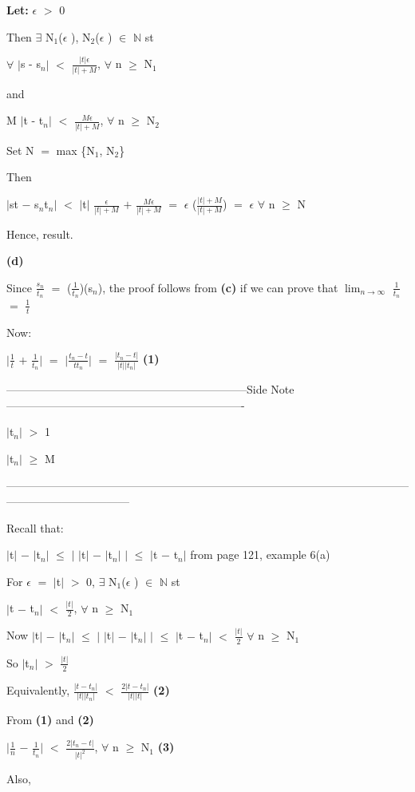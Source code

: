 \documentclass{article}
\newcommand{\mt}[1]{\ensuremath{#1}}
\newcommand{\lt}[1]{\textbf{Let: } #1}
\newcommand{\bpth}[1]{\textbf{(#1)}}
\newcommand{\sidenote}[1]{-----------------------------------------------------------------Side Note----------------------------------------------------------------
#1 \

---------------------------------------------------------------------------------------------------------------------------------------------}
\newcommand{\bn}{\mt{\mathbb{N}} }       %
\newcommand{\ep}{\mt{\epsilon} }         %
\newcommand{\fa}{\mt{\forall} }          %
\newcommand{\mem}{\mt{\in} }
\newcommand{\exs}{\mt{\exists} }
\newcommand{\eql}{\mt{=} }
\newcommand{\uw}[2]{#1\mt{_{#2}}}
\newcommand{\frc}[2]{\mt{\frac{#1}{#2}}}
\newcommand{\lmti}[1]{\mt{\displaystyle{\lim_{#1 \to \infty}}}}
\begin{document}
{{\lt{\ep $>$ 0}

Then \exs \uw{N}{1}(\ep), \uw{N}{2}(\ep) \mem \bn st

\fa $|$s - \uw{s}{n}$|$ $<$ $\frac{|t|\epsilon}{|t| + M}$, \fa n $\geq$ \uw{N}{1}

and

M $|$t - \uw{t}{n}$|$ $<$ $\frac{M\epsilon}{|t| + M}$, \fa n $\geq$ \uw{N}{2}

Set N \eql max \{\uw{N}{1}, \uw{N}{2}\}

Then

$|$st $-$ \uw{s}{n}\uw{t}{n}$|$ $<$ $|$t$|$ $\frac{\epsilon}{|t| + M}$ $+$ $\frac{M \ep}{|t| + M}$ \eql \ep ($\frac{|t| + M}{|t| + M}$) \eql \ep \fa n $\geq$ N

Hence, result. \

\newpage

\bpth{d}

Since $\frac{\uw{s}{n}}{\uw{t}{n}}$ \eql (\frc{1}{\uw{t}{n}})(\uw{s}{n}), the proof follows from \bpth{c} if we can prove that \lmti{n} \frc{1}{\uw{t}{n}} \eql \frc{1}{t}

Now:

$|$\frc{1}{t} $+$ \frc{1}{\uw{t}{n}}$|$ \eql $|$\frc{\uw{t}{n} - t}{t\uw{t}{n}}$|$ \eql \frc{|\uw{t}{n} - t|}{|t||\uw{t}{n}|} \bpth{1}

\sidenote{
$|$\uw{t}{n}$|$ $>$ 1

$|$\uw{t}{n}$|$ $\geq$ M
}

Recall that:

$|$t$|$ $-$ $|$\uw{t}{n}$|$ $\leq$ $|$ $|$t$|$ $-$ $|$\uw{t}{n}$|$ $|$ $\leq$ $|$t $-$ \uw{t}{n}$|$ from page 121, example 6(a)

For \ep \eql $|$t$|$ $>$ 0, \exs \uw{N}{1}(\ep) \mem \bn st

$|$t $-$ \uw{t}{n}$|$ $<$ \frc{|t|}{2}, \fa n $\geq$ \uw{N}{1}

Now $|$t$|$ $-$ $|$\uw{t}{n}$|$ $\leq$ $|$ $|$t$|$ $-$ $|$\uw{t}{n}$|$ $|$ $\leq$ $|$t $-$ \uw{t}{n}$|$ $<$ $\frac{|t|}{2}$ \fa n $\geq$ \uw{N}{1}

So $|$\uw{t}{n}$|$ $>$ $\frac{|t|}{2}$

Equivalently, $\frac{|t - \uw{t}{n}|}{|t||\uw{t}{n}|}$ $<$ $\frac{2|t - \uw{t}{n}|}{|t||t|}$ \bpth{2}

From \bpth{1} and \bpth{2}

$|$\frc{1}{n} $-$ \frc{1}{\uw{t}{n}}$|$ $<$ $\frac{2|\uw{t}{n} - t|}{|t|^2}$, \fa n $\geq$ \uw{N}{1} \bpth{3}

Also,

}}
\end{document}
